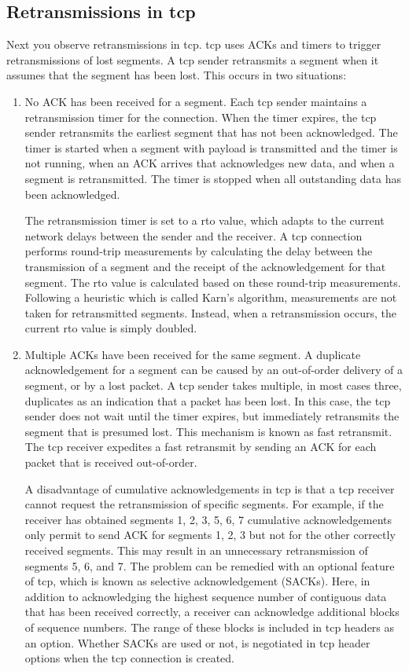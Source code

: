 \newpage
\subsection{Retransmissions in \ac{tcp}}
Next you observe retransmissions in \ac{tcp}. \ac{tcp} uses ACKs and timers to trigger retransmissions of lost segments. A \ac{tcp} sender retransmits a segment when it assumes that the segment has been lost. This occurs in two situations:

\begin{enumerate}
	\item No ACK has been received for a segment. Each \ac{tcp} sender maintains a retransmission timer for the connection. When the timer expires, the \ac{tcp} sender retransmits the earliest segment that has not been acknowledged. The timer is started when a segment with payload is transmitted and the timer is not running, when an ACK arrives that acknowledges new data, and when a segment is retransmitted. The timer is stopped when all outstanding data has been acknowledged.
	
	The retransmission timer is set to a \acf{rto} value, which adapts to the current network delays between the sender and the receiver. A \ac{tcp} connection performs round-trip measurements by calculating the delay between the transmission of a segment and the receipt of the acknowledgement for that segment. The \ac{rto} value is calculated based on these round-trip measurements. Following a heuristic which is called Karn's algorithm, measurements are not taken for retransmitted segments. Instead, when a retransmission occurs, the current \ac{rto} value is simply doubled.
	
	\item Multiple ACKs have been received for the same segment. A duplicate acknowledgement for a segment can be caused by an out-of-order delivery of a segment, or by a lost packet. A \ac{tcp} sender takes multiple, in most cases three, duplicates as an indication that a packet has been lost. In this case, the \ac{tcp} sender does not wait until the timer expires, but immediately retransmits the segment that is presumed lost. This mechanism is known as fast retransmit. The \ac{tcp} receiver expedites a fast retransmit by sending an ACK for each packet that is received out-of-order.
	
	A disadvantage of cumulative acknowledgements in \ac{tcp} is that a \ac{tcp} receiver cannot request the retransmission of specific segments. For example, if the receiver has obtained segments 1, 2, 3, 5, 6, 7 cumulative acknowledgements only permit to send ACK for segments 1, 2, 3 but not for the other correctly received segments. This may result in an unnecessary retransmission of segments 5, 6, and 7. The problem can be remedied with an optional feature of \ac{tcp}, which is known as selective acknowledgement (SACKs). Here, in addition to acknowledging the highest sequence number of contiguous data that has been received correctly, a receiver can acknowledge additional blocks of sequence numbers. The range of these blocks is included in \ac{tcp} headers as an option. Whether SACKs are used or not, is negotiated in \ac{tcp} header options when the \ac{tcp} connection is created.
\end{enumerate}

